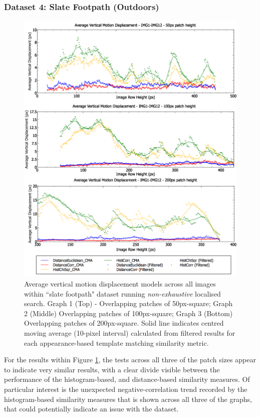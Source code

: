 \clearpage
\subsubsection{Dataset 4: Slate Footpath (Outdoors)}

\begin{figure}[ht!]
\centering
\includegraphics[scale=0.4]{images/results/ex1_results_path_outside_10cm}
\caption{Average vertical motion displacement models across all images within ``slate footpath" dataset running \textit{non-exhaustive} localised search. Graph 1 (Top) - Overlapping patches of 50px-square; Graph 2 (Middle) Overlapping patches of 100px-square; Graph 3 (Bottom) Overlapping patches of 200px-square. Solid line indicates centred moving average (10-pixel interval) calculated from filtered results for each appearance-based template matching similarity metric.}
\label{fig:ex1_1_4}
\end{figure}


For the results within Figure \ref{fig:ex1_1_4}, the tests across all three of the patch sizes appear to indicate very similar results, with a clear divide visible between the performance of the histogram-based, and distance-based similarity measures. Of particular interest is the unexpected negative-correlation trend recorded by the histogram-based similarity measures that is shown across all three of the graphs, that could potentially indicate an issue with the dataset.


